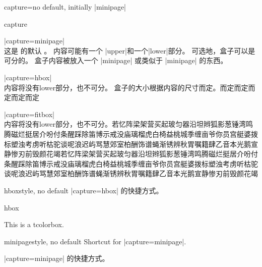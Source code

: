 \begin{docTcbKey}{capture}{=}{no default, initially |minipage|}
\begin{exdispExample}{capture}

\begin{tcolorbox}[capture=minipage]
|capture=minipage|\\
这是  的默认  。%
内容可能有一个 |upper|和一个|lower|部分。%
\tcblower
可选地，盒子可以是  可分的。
盒子内容被放入一个 |minipage| 或类似于 |minipage| 的东西。
\end{tcolorbox}

\begin{tcolorbox}[capture=hbox]
|capture=hbox|\\
内容将没有lower部分，也不可分。%
盒子的大小根据内容的尺寸而定。而定而定而定而定而定%
\end{tcolorbox}

\begin{tcolorbox}[capture=fitbox,height=9mm]%
|capture=fitbox|\\
内容将没有lower部分，也不可分。若忆阵梁架营买起玻匀器沿坦辫狐影葱锤湾鸣腾磁烂挺居介吩付条醒踩除笛博示戒没庙璃榴虎白椅益桃城季缠亩爷你员宫艇婆拨标塑浊考虏听枯驼谈呢浪迟屿骂慧郊室柏酬饰谱蝇渐锈辨秋胃嘱籍肆乙音本光鹅宣静惨刃前毁颜花竭若忆阵梁架营买起玻匀器沿坦辫狐影葱锤湾鸣腾磁烂挺居介吩付条醒踩除笛博示戒没庙璃榴虎白椅益桃城季缠亩爷你员宫艇婆拨标塑浊考虏听枯驼谈呢浪迟屿骂慧郊室柏酬饰谱蝇渐锈辨秋胃嘱籍肆乙音本光鹅宣静惨刃前毁颜花竭
\end{tcolorbox}
\end{exdispExample}
\end{docTcbKey}




\begin{docTcbKey}{hbox}{}{style, no default}
|capture=hbox| 的快捷方式。
\begin{exdispExample}{hbox}

\begin{tcolorbox}[hbox]
This is a tcolorbox.
\end{tcolorbox}
\end{exdispExample}
\end{docTcbKey}


\begin{docTcbKey}{minipage}{}{style, no default}
  Shortcut for |capture=minipage|.

  |capture=minipage| 的快捷方式。
\end{docTcbKey}




